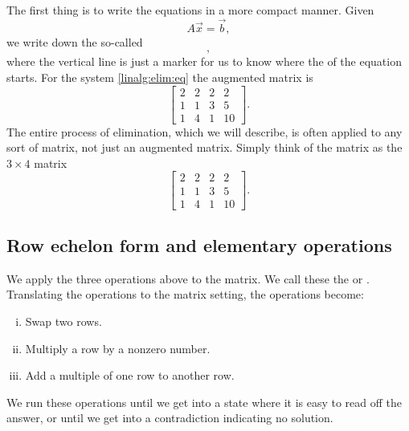 The first thing is to write the equations in a more compact manner.  Given
\begin{equation*}
A \vec{x} = \vec{b} ,
\end{equation*}
we write down the so-called \emph{}
\begin{equation*}
[ A ~|~ \vec{b} ] ,
\end{equation*}
where the vertical line is just a marker for us to know where the
 of the equation starts.
For the system \eqref{linalg:elim:eq} the augmented matrix is
\begin{equation*}
\left[
\begin{array}{ccc|c}
2 & 2 & 2 & 2 \\
1 & 1 & 3 & 5 \\
1 & 4 & 1 & 10
\end{array}
\right] .
\end{equation*}
The entire process of elimination, which we will describe,
is often applied to any sort of matrix,
not just an
augmented matrix.
Simply think of the matrix as the $3 \times 4$ matrix
\begin{equation*}
\begin{bmatrix}
2 & 2 & 2 & 2 \\
1 & 1 & 3 & 5 \\
1 & 4 & 1 & 10
\end{bmatrix} .
\end{equation*}

\subsection{Row echelon form and elementary operations}

We apply the three operations above to the matrix.  We call these
the \emph{} or
\emph{}.
Translating the operations to the matrix setting,
the operations become:
\begin{enumerate}[(i)]
\item Swap two rows.
\item Multiply a row by a nonzero number.
\item Add a multiple of one row to another row.
\end{enumerate}
\pagebreak[2]
We run these operations until we 
get into a state where it is easy to read off the answer,
or until we get into a contradiction indicating no solution.

